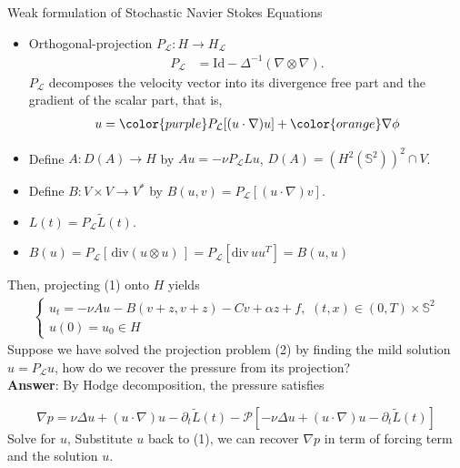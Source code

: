 \documentclass[xcolor=dvipsnames,leqno]{beamer}
\begin{document}
\begin{frame}{Weak formulation of Stochastic Navier Stokes Equations}
\begin{itemize}
	\item Orthogonal-projection $P_{\mathcal{L}} : H\to H_{\mathcal{L}}$
	\begin{align*}
		P_{\mathcal{L}}&=\text{Id}-\Delta^{-1}(\nabla\otimes\nabla).
	\end{align*}
 $P_{\mathcal{L}}$	decomposes the velocity vector into its {\color{purple}divergence free part} and the {\color{orange}gradient of the scalar part}, that is, 
	\begin{align*}
		u={\color{purple}P_{\mathcal{L}}[(u\cdot\nabla)u]}+{\color{orange}\nabla \phi}
	\end{align*}
	\item Define $A: D(A)\to H$ by $Au=-\nu P_{\mathcal{L}} L u$, $D(A)=(H^2(\mathbb{S}^2))^2\cap V$.
	\item Define $B: V\times V\to V^{*}$ by $B(u,v)=P_{\mathcal{L}}[(u\cdot\nabla)v]$.
	\item $L(t)=P_{{\mathcal{L}}}\tilde{L}(t)$.%
	\item $B(u)=P_{\mathcal{L}}[\, \text{div}(u\otimes u)\, ]=P_{\mathcal{L}}[\text{div} \, uu^{T}]=B(u,u)$%
\end{itemize}	
\end{frame}
\begin{frame}
Then, projecting (1) onto $H$ yields 
\begin{align*}
	\begin{cases}
	u_t=-\nu Au-B(v+z,v+z)-Cv+\alpha z+f,\,\,(t, x)\in (0, T)\times\mathbb{S}^2 \\
		u(0)=u_0\in H
	\end{cases}
\end{align*}
Suppose we have solved the projection problem (2) by finding the mild solution $u=P_{\mathcal{L}} u$, how do we recover the pressure from its projection?\\
\vspace{1cm}
\textbf{Answer}: By Hodge decomposition, the pressure satisfies

\[
	\nabla p=\nu\Delta u+(u\cdot\nabla)u-\partial_t \tilde{L}(t)-\mathcal{P}[-\nu\Delta u+(u\cdot\nabla)u-\partial_t \tilde{L}(t)]
\]
Solve for $u$, Substitute $u$ back to (1), we can recover $\nabla p$ in term of forcing term and the solution $u$.
\end{frame}
     
\end{document}

